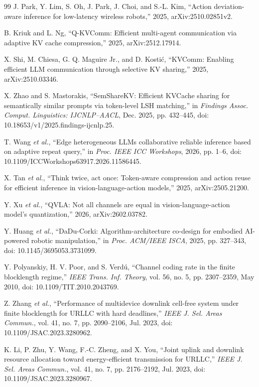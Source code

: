 \documentclass[letterpaper,journal]{IEEEtran}
\newcommand{\etal}{\emph{et al.}}
\begin{document}
\begin{thebibliography}{99}
J. Park, Y. Lim, S. Oh, J. Park, J. Choi, and S.-L. Kim, ``Action
deviation-aware inference for low-latency wireless robots,''
2025, arXiv:2510.02851v2.

B. Kriuk and L. Ng, ``Q-KVComm: Efficient multi-agent communication via
adaptive KV cache compression,'' 2025, arXiv:2512.17914.

X. Shi, M. Chiesa, G. Q. Maguire Jr., and D. Kosti\'c, ``KVComm: Enabling
efficient LLM communication through selective KV sharing,'' 2025,
arXiv:2510.03346.

X. Zhao and S. Mastorakis, ``SemShareKV: Efficient KVCache sharing for
semantically similar prompts via token-level LSH matching,'' in \emph{Findings
Assoc. Comput. Linguistics: IJCNLP--AACL}, Dec. 2025, pp. 432--445,
doi: 10.18653/v1/2025.findings-ijcnlp.25.

T. Wang \etal, ``Edge heterogeneous LLMs collaborative reliable inference based on adaptive
repeat query,'' in \emph{Proc. IEEE ICC Workshops}, 2026, pp. 1--6,
doi: 10.1109/ICCWorkshops63917.2026.11586445.

X. Tan \etal, ``Think twice, act once: Token-aware compression and action reuse for
efficient inference in vision-language-action models,'' 2025,
arXiv:2505.21200.

Y. Xu \etal, ``QVLA: Not all channels are equal in vision-language-action
model's quantization,'' 2026, arXiv:2602.03782.

Y. Huang \etal, ``DaDu-Corki: Algorithm-architecture co-design for embodied
AI-powered robotic manipulation,'' in \emph{Proc. ACM/IEEE ISCA}, 2025,
pp. 327--343,
doi: 10.1145/3695053.3731099.

Y. Polyanskiy, H. V. Poor, and S. Verd\'u, ``Channel coding rate in the finite
blocklength regime,'' \emph{IEEE Trans. Inf. Theory}, vol. 56, no. 5,
pp. 2307--2359, May 2010,
doi: 10.1109/TIT.2010.2043769.

Z. Zhang \etal, ``Performance of multidevice downlink cell-free system under
finite blocklength for URLLC with hard deadlines,'' \emph{IEEE J. Sel. Areas
Commun.}, vol. 41, no. 7, pp. 2090--2106, Jul. 2023,
doi: 10.1109/JSAC.2023.3280962.

K. Li, P. Zhu, Y. Wang, F.-C. Zheng, and X. You, ``Joint uplink and downlink
resource allocation toward energy-efficient transmission for URLLC,''
\emph{IEEE J. Sel. Areas Commun.}, vol. 41, no. 7, pp. 2176--2192,
Jul. 2023,
doi: 10.1109/JSAC.2023.3280967.


\end{thebibliography}
\end{document}
